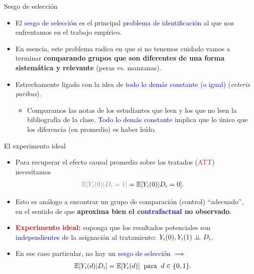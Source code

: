\documentclass[10pt, xcolor=dvipsnames]{beamer}
\begin{document}
\begin{frame}{Sesgo de selección}
\begin{itemize}\setlength{\itemsep}{1.5em}
	\item El \textcolor{blue}{sesgo de selección} es el principal \textcolor{blue}{problema de identificación} al que nos enfrentamos en el trabajo empírico. \\
	\pause
	\item En esencia, este problema radica en que si no tenemos cuidado vamos a terminar \textbf{comparando grupos que son diferentes de una forma sistemática y relevante} (peras vs. manzanas). \\
	\pause
	\item Estrechamente ligado con la idea de \textcolor{blue}{todo lo demás constante (o igual)} (\textit{ceteris paribus}). \\ \vspace{0.1cm}
	\begin{itemize}
		\item Comparamos las notas de los estudiantes que leen y los que no leen la bibliografía de la clase. \textcolor{blue}{Todo lo demás constante} implica que lo único que los diferencia (en promedio) es haber leído.
	\end{itemize}
\end{itemize} 
\end{frame}

\begin{frame}{El experimento ideal}
    \begin{itemize}\setlength{\itemsep}{0.0em}
    	\item Para recuperar el efecto causal promedio sobre los tratados (\textcolor{brown}{ATT}) necesitamos
    \begin{align}
    \textcolor{gray}{\EX[Y_i(0)|D_i =1]} = \EX[Y_i(0)|D_i =0].
    \end{align} 
    \item Esto es análogo a encontrar un grupo de comparación (control) ``adecuado'', en el sentido de que \textbf{aproxima bien el \textcolor{blue}{contrafactual} no observado}. \\ \vspace{0.1cm}
    \item \textcolor{red}{\textbf{Experimento ideal:}} suponga que los resultados potenciales son \textcolor{blue}{independientes} de la asignación al tratamiento: $Y_i(0), Y_i(1) \perp \!\!\! \perp D_i$.%
    \item En ese caso particular, no hay un \textcolor{blue}{sesgo de selección} $\implies$
    \begin{align*}
    	\operatorname{\mathbb{E}}[Y_i(d)|D_i] = \operatorname{\mathbb{E}}[Y_i(d)] \hspace{0.2cm} \text{para} \hspace{0.2cm} d \in \{0,1\}.
    \end{align*}
\end{itemize}
\end{frame}
\end{document}
